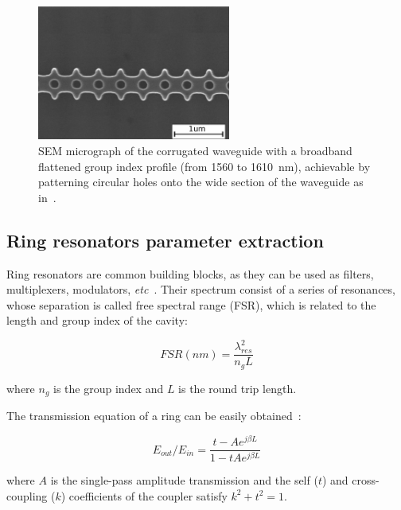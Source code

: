 \documentclass[journal]{IEEEtran}
\newcommand{\fwidthSmall}{2.5in}
\begin{document}
\begin{figure}[htb]
	\centering
	\includegraphics[width=\fwidthSmall]{corrTEscale}	
	\caption{SEM micrograph of the corrugated waveguide with a broadband flattened group index profile (from 1560 to 1610~nm), achievable by patterning circular holes onto the wide section of the waveguide as in~\cite{Brimont2010}.}
	\label{fig:sem}
 \end{figure} 


\subsection{Ring resonators parameter extraction}
\label{sec:ringResonators}
Ring resonators are common building blocks, as they can be used as filters, multiplexers, modulators, \emph{etc}~\cite{Bogaerts:12}.
Their spectrum consist of a series of resonances, whose separation is called free spectral range (FSR), which is related to the length and group index of the cavity:

\begin{equation}
	FSR (nm)=\frac{\lambda_{res}^2}{n_gL}
	\label{eq:FSRanillo}
\end{equation} 

where $n_g$ is the group index and $L$ is the round trip length.

The transmission equation of a ring can be easily obtained~\cite{McKinnon2009}:

\begin{equation}
	E_{out}/E_{in}=\frac{t-Ae^{j\beta L}}{1-tAe^{j\beta L}}
\label{eq:transmissionRing}
\end{equation}


where $A$ is the single-pass amplitude transmission and the self ($t$) and cross-coupling ($k$) coefficients of the coupler satisfy $k^2+t^2=1$.
\end{document}
